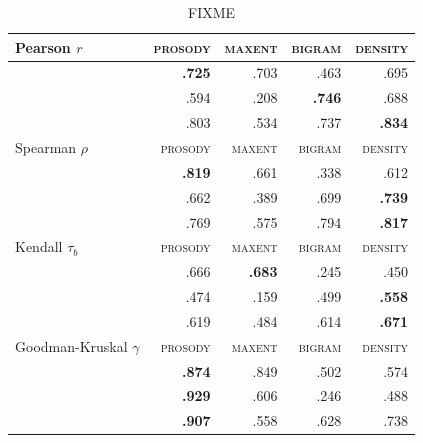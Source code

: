 \begin{table}
\centering
\begin{tabular}{l rrrr}
\toprule
Pearson $r$               & \textsc{prosody} & \textsc{maxent} & \textsc{bigram} & \textsc{density} \\
\midrule
\citealt{Albright2007}    & \textbf{.725}    & {.703}          & {.463}          & {.695}           \\
\citealt{Albright2003b}   & {.594}           & {.208}          & \textbf{.746}   & {.688}           \\
\citealt{Scholes1966}     & {.803}           & {.534}          & {.737}          & \textbf{.834}    \\
\midrule
Spearman $\rho$           & \textsc{prosody} & \textsc{maxent} & \textsc{bigram} & \textsc{density} \\
\midrule
\citealt{Albright2007}    & \textbf{.819}    & {.661}          & {.338}          & {.612}           \\
\citealt{Albright2003b}   & {.662}           & {.389}          & {.699}          & \textbf{.739}    \\
\citealt{Scholes1966}     & {.769}           & {.575}          & {.794}          & \textbf{.817}    \\
\midrule
Kendall $\tau_{b}$        & \textsc{prosody} & \textsc{maxent} & \textsc{bigram} & \textsc{density} \\
\midrule
\citealt{Albright2007}    & {.666}           & \textbf{.683}   & {.245}          & {.450}           \\
\citealt{Albright2003b}   & {.474}           & {.159}          & {.499}          & \textbf{.558}    \\
\citealt{Scholes1966}     & {.619}           & {.484}          & {.614}          & \textbf{.671}    \\
\midrule
Goodman-Kruskal $\gamma$  & \textsc{prosody} & \textsc{maxent} & \textsc{bigram} & \textsc{density} \\
\midrule
\citealt{Albright2007}    & \textbf{.874}    & {.849}          & {.502}          & {.574}           \\
\citealt{Albright2003b}   & \textbf{.929}    & {.606}          & {.246}          & {.488}           \\
\citealt{Scholes1966}     & \textbf{.907}    & {.558}          & {.628}          & {.738}           \\
\bottomrule
\end{tabular}
\caption{FIXME}
\label{scores}
\end{table}

